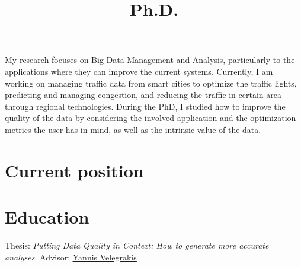\documentclass[10pt,a4paper,colorlinks,linkcolor=true]{moderncv}
\title{Ph.D.}
\newcommand{\cvlink}[2]{\href{#1}{\ul{#2}}}
\begin{document}
\hypersetup{urlcolor=color1}

\makecvtitle
\pagestyle{empty} %
\setlength{\parskip}{0.4ex}

\vspace*{-5mm}

My research focuses on Big Data Management and Analysis, particularly to the applications where they can improve the current systems.
Currently, I am working on managing traffic data from smart cities to optimize the traffic lights, predicting and managing congestion, and reducing the traffic in certain area through regional technologies.
During the PhD, I studied how to improve the quality of the data by considering the involved application and the optimization metrics the user has in mind, as well as the intrinsic value of the data.


\section{Current position}



\section{Education}

  {Thesis: \emph{Putting Data Quality in Context: How to generate more accurate analyses}. Advisor: \cvlink{https://scholar.google.it/citations?user=FI1rYesAAAAJ}{Yannis Velegrakis}}
\end{document}

